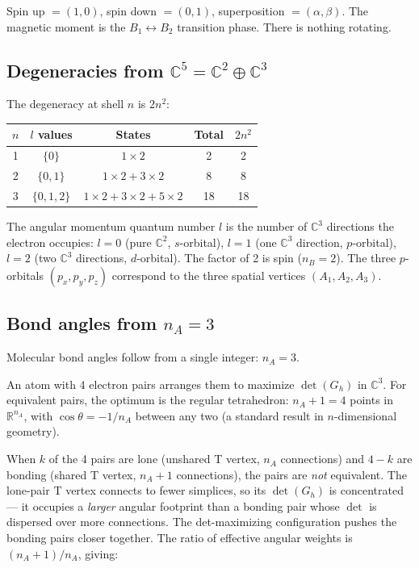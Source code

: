\documentclass[12pt]{article}
\theoremstyle{remark}
\theoremstyle{definition}
\newcommand{\CC}{\mathbb{C}}
\begin{document}
Spin up $= (1, 0)$, spin down $= (0, 1)$, superposition $= (\alpha, \beta)$. The magnetic moment is the $B_1 \leftrightarrow B_2$ transition phase. There is nothing rotating.

\subsection{Degeneracies from $\CC^5 = \CC^2 \oplus \CC^3$}

The degeneracy at shell $n$ is $2n^2$:
\begin{center}
\begin{tabular}{ccccc}
\hline
$n$ & $l$ values & States & Total & $2n^2$ \\
\hline
1 & $\{0\}$ & $1 \times 2$ & 2 & 2 \\
2 & $\{0, 1\}$ & $1 \times 2 + 3 \times 2$ & 8 & 8 \\
3 & $\{0, 1, 2\}$ & $1 \times 2 + 3 \times 2 + 5 \times 2$ & 18 & 18 \\
\hline
\end{tabular}
\end{center}

The angular momentum quantum number $l$ is the number of $\CC^3$ directions the electron occupies: $l = 0$ (pure $\CC^2$, $s$-orbital), $l = 1$ (one $\CC^3$ direction, $p$-orbital), $l = 2$ (two $\CC^3$ directions, $d$-orbital). The factor of 2 is spin ($n_B = 2$). The three $p$-orbitals $(p_x, p_y, p_z)$ correspond to the three spatial vertices $(A_1, A_2, A_3)$.

\subsection{Bond angles from $n_A = 3$}

Molecular bond angles follow from a single integer: $n_A = 3$.

An atom with 4 electron pairs arranges them to maximize $\det(G_h)$ in $\CC^3$. For equivalent pairs, the optimum is the regular tetrahedron: $n_A + 1 = 4$ points in $\mathbb{R}^{n_A}$, with $\cos\theta = -1/n_A$ between any two (a standard result in $n$-dimensional geometry).

When $k$ of the 4 pairs are lone (unshared T vertex, $n_A$ connections) and $4-k$ are bonding (shared T vertex, $n_A + 1$ connections), the pairs are \emph{not} equivalent. The lone-pair T vertex connects to fewer simplices, so its $\det(G_h)$ is concentrated --- it occupies a \emph{larger} angular footprint than a bonding pair whose $\det$ is dispersed over more connections. The det-maximizing configuration pushes the bonding pairs closer together. The ratio of effective angular weights is $(n_A + 1)/n_A$, giving:
\end{document}
